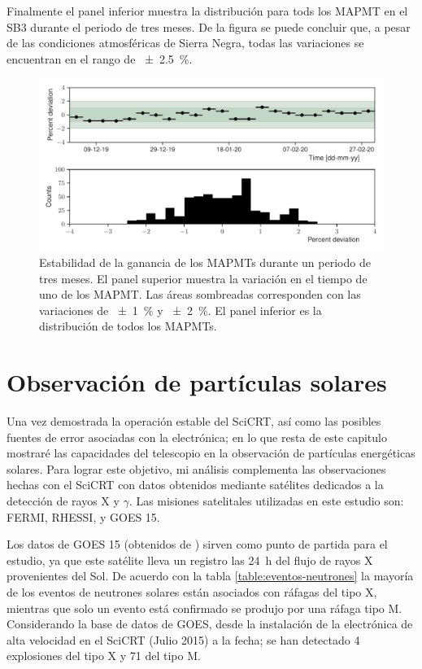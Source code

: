 Finalmente el panel inferior muestra la distribución para tods los MAPMT en el SB3 durante el periodo de tres meses. De la figura se puede concluir que, a pesar de las condiciones atmosféricas de Sierra Negra, todas las variaciones se encuentran en el rango de \SI{\pm 2.5}{\percent}.

\begin{figure}
        \centering
        \includegraphics[width=\textwidth]{neutron-mip_stability.pdf}
        \caption{Estabilidad de la ganancia de los MAPMTs durante un periodo de tres meses. El panel superior muestra la variación en el tiempo de uno de los MAPMT. Las áreas sombreadas corresponden con las variaciones de \SI{\pm 1}{\percent} y \SI{\pm 2}{\percent}. El panel inferior es la distribución de todos los MAPMTs.}
        \label{fig:mip-stability}
\end{figure}

\section{Observación de partículas solares}

Una vez demostrada la operación estable del SciCRT, así como las posibles fuentes de error asociadas con la electrónica; en lo que resta de este capitulo mostraré las capacidades del telescopio en la observación de partículas energéticas solares. Para lograr este objetivo, mi análisis complementa las observaciones hechas con el SciCRT con datos obtenidos mediante satélites dedicados a la detección de rayos X y $\gamma$. Las misiones satelitales utilizadas en este estudio son: FERMI, RHESSI, y GOES \num{15}.

Los datos de GOES \num{15} (obtenidos de \cite{goesdata}) sirven como punto de partida para el estudio, ya que este satélite lleva un registro las \SI{24}{\hour} del flujo de rayos X provenientes del Sol. De acuerdo con la tabla \ref{table:eventos-neutrones} la mayoría de los eventos de neutrones solares están asociados con ráfagas del tipo X, mientras que solo un evento está confirmado se produjo por una ráfaga tipo M. Considerando la base de datos de GOES, desde la instalación de la electrónica de alta velocidad en el SciCRT (Julio \num{2015}) a la fecha; se han detectado \num{4} explosiones del tipo X y \num{71} del tipo M.

